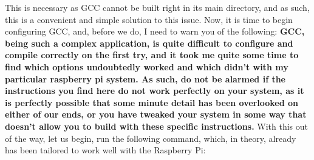 \documentclass[]{article}
\begin{document}
                                                                                                                                                                                     This is necessary as GCC cannot be built right in its main directory, and as such, this is a convenient and simple solution to this
                                                                                                                                                                                     issue. Now, it is time to begin configuring GCC, and, before we do, I need to warn you of the following: \textbf{GCC, being such a
                                                                                                                                                                                         complex application, is quite difficult to configure and compile correctly on the first try, and it took me quite some time to find
                                                                                                                                                                                             which options undoubtedly worked and which didn't with my particular raspberry pi system. As such, do not be alarmed if the 
                                                                                                                                                                                             instructions you find here do not work perfectly on your system, as it is perfectly possible that some minute detail has been 
                                                                                                                                                                                             overlooked on either of our ends, or you have tweaked your system in some way that doesn't allow you to build with these specific
                                                                                                                                                                                             instructions.} With this out of the way, let us begin, run the following command, which, in theory, already has been tailored to work
                                                                                                                                                                                             well with the Raspberry Pi:
\end{document}
